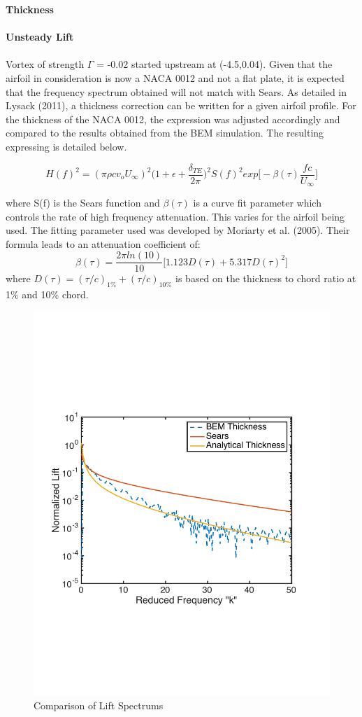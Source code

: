 \documentclass{article}
\begin{document}
\noindent \textbf{Thickness} \\ \\
\noindent \textbf{Unsteady Lift} \\ \\
Vortex of strength $\Gamma$ = -0.02 started upstream at (-4.5,0.04). Given that the airfoil in consideration is now a NACA 0012 and not a flat plate, it is expected that the frequency spectrum obtained will not match with Sears. As detailed in Lysack (2011), a thickness correction can be written for a given airfoil profile. For the thickness of the NACA 0012, the expression was adjusted accordingly and compared to the results obtained from the BEM simulation. The resulting expressing is detailed below. 

\begin{equation}
H(f)^2 = (\pi \rho c v_o U_{\infty})^2\Bigg(1 + \epsilon + \frac{\delta_{TE}}{2\pi} \Bigg )^2 S(f)^2 exp\Bigg[-\beta(\tau)\frac{fc}{U_{\infty}}\Bigg]
\end{equation}

\noindent where S(f) is the Sears function and $\beta(\tau)$ is a curve fit parameter which controls the rate of high frequency attenuation. This varies for the airfoil being used. The fitting parameter used was developed by Moriarty et al. (2005). Their formula leads to an attenuation coefficient of: 
\begin{equation}
\beta(\tau) = \frac{2\pi ln(10)}{10} \big[1.123D(\tau) + 5.317D(\tau)^2 \big]
\end{equation}
where $D(\tau) = (\tau/c)_{1\%} + (\tau/c)_{10\%}$ is based on the thickness to chord ratio at 1$\%$ and 10$\%$ chord. 

\begin{figure}[h]
\includegraphics[width = 4 in, height = 3 in]{BEM_Compare}
\centering
\caption{Comparison of Lift Spectrums}
\end{figure}
\end{document}
